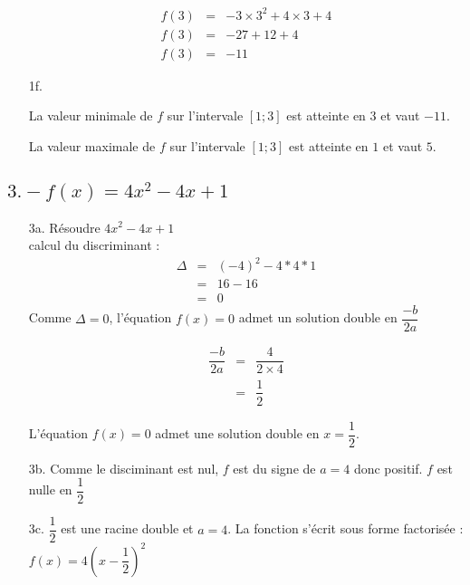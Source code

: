 \documentclass[11pt]{article}
\begin{document}
\begin{enumerate}
\begin{multicols}{2}
    \begin{eqnarray*}
      f(3) &=& -3 \times 3^2 + 4 \times 3 + 4 \\
      f(3) &=& -27 + 12 + 4 \\
      f(3) &=& -11
    \end{eqnarray*}

  \end{multicols} 


\item[1f.] 

  La valeur minimale de $f$ sur l'intervale $[1 ; 3]$ est atteinte en $3$ et vaut $-11$.

  La valeur maximale de $f$ sur l'intervale $[1 ; 3]$ est atteinte en $1$ et vaut $5$.

\end{enumerate}

\newpage

\subsection{$3. - f(x) = 4x^2 - 4x + 1$}

\begin{enumerate}

\item[3a.] Résoudre $4x^2 - 4x + 1$\\
  calcul du discriminant :
  \begin{eqnarray*}
    \Delta &=& (-4)^2 - 4*4*1\\
    &=& 16 - 16\\
    &=& 0
  \end{eqnarray*}
  Comme $\Delta = 0$, l'équation $f(x) =0 $ admet un solution double en $\dfrac{-b}{2a}$

  \begin{eqnarray*}  
    \dfrac{-b}{2a} &=& \dfrac{4}{2 \times 4} \\
    &=& \dfrac{1}{2}
  \end{eqnarray*} 

  L'équation $f(x) = 0$ admet une solution double en $x = \dfrac{1}{2}$.

\item[3b.] Comme le disciminant est nul, $f$ est du signe de $a=4$ donc positif. $f$ est nulle en $\dfrac{1}{2}$


\item[3c.] $\dfrac{1}{2}$ est une racine double et $a=4$. La fonction s'écrit sous forme factorisée : $f(x) = 4 \left( x-\dfrac{1}{2} \right)^2$

\end{enumerate}
\end{document}
